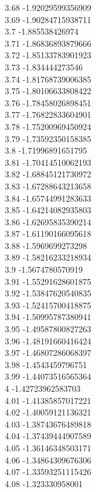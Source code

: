 {3.68	-1.92029599356909\\
3.69	-1.90284715938711\\
3.7	-1.885538426974\\
3.71	-1.86836893879666\\
3.72	-1.85133783901923\\
3.73	-1.834444273546\\
3.74	-1.81768739006385\\
3.75	-1.80106633808422\\
3.76	-1.78458026898451\\
3.77	-1.76822833604901\\
3.78	-1.75200969450924\\
3.79	-1.73592350158385\\
3.8	-1.71996891651795\\
3.81	-1.70414510062193\\
3.82	-1.68845121730972\\
3.83	-1.67288643213658\\
3.84	-1.65744991283633\\
3.85	-1.64214082935803\\
3.86	-1.62695835390214\\
3.87	-1.61190166095618\\
3.88	-1.5969699273298\\
3.89	-1.58216233218934\\
3.9	-1.5674780570919\\
3.91	-1.55291628601875\\
3.92	-1.53847620540835\\
3.93	-1.52415700418875\\
3.94	-1.50995787380941\\
3.95	-1.49587800827263\\
3.96	-1.48191660416424\\
3.97	-1.46807286068397\\
3.98	-1.4543459796751\\
3.99	-1.44073516565364\\
4	-1.42723962583703\\
4.01	-1.41385857017221\\
4.02	-1.40059121136321\\
4.03	-1.38743676489818\\
4.04	-1.37439444907589\\
4.05	-1.36146348503171\\
4.06	-1.34864309676306\\
4.07	-1.33593251115426\\
4.08	-1.323330958001\\
}
